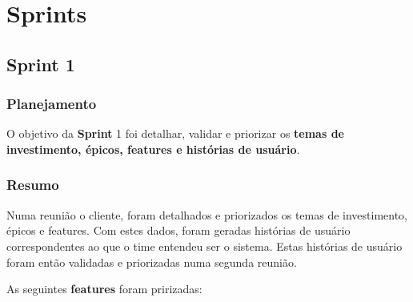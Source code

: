 
\chapter[Sprints]{Sprints}


\section{\large{Sprint 1}}

\subsection{Planejamento}
    O objetivo da \textbf{Sprint} 1 foi detalhar, validar e priorizar os \textbf{temas de investimento, épicos, features e histórias de usuário}.

\subsection{Resumo}
    Numa reunião o cliente, foram detalhados e priorizados os temas de investimento, épicos e features. Com estes dados, foram geradas histórias de usuário correspondentes ao que o time entendeu ser o sistema. Estas histórias de usuário foram então validadas e priorizadas numa segunda reunião.

    As seguintes \textbf{features} foram pririzadas:

